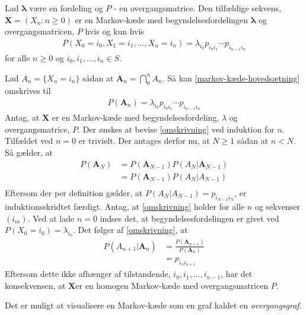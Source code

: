 \begin{minipage}\textwidth
\begin{thmx} \textbf{} %
\newline
Lad $\bm{\lambda}$ være en fordeling og $P$ - en overgangsmatrice. Den tilfældige sekvens, $\mathbf{X}=(X_n:n\geq0)$ er en Markov-kæde med begyndelsesfordelingen $\bm{\lambda}$ og overgangsmatricen, $P$ hvis og kun hvis
\begin{align}\label{markov-kæde-hovedsætning}
    P(X_0=i_0,X_1=i_1,\dots, X_n=i_n)=\lambda_{i_0}p_{i_0i_1}\cdots p_{i_{n-1}i_n}
\end{align}
for alle $n\geq0$ og $i_0,i_1,\dots,i_n\in S$.
\end{thmx}
\end{minipage}
\begin{bev} \textbf{}
\newline
Lad $A_n=\{X_n=i_n\}$ sådan at $\bm A_n=\bigcap_0^n A_n$. Så kan \eqref{markov-kæde-hovedsætning} omskrives til
\begin{align}\label{omskrivning}
    P(\bm A_n)=\lambda_{i_0}p_{i_0i_1}\cdots p_{i_{n-1}i_n}
\end{align}
Antag, at $\bm X$ er en Markov-kæde med begyndelsesfordeling, $\lambda$ og overgangsmatrice, $P$. Der ønskes at bevise \eqref{omskrivning} ved induktion for $n$. Tilfældet ved $n=0$ er trivielt. Der antages derfor nu, at $N\geq1$ sådan at $n<N$. Så gælder, at
\begin{align*}
    P(\bm A_N)&=P(\bm A_{N-1})P(A_N|\bm A_{N-1})\\
    &=P(\bm A_{N-1})P(A_N|A_{N-1})\\
\end{align*}
Eftersom der per definition gælder, at
$P(A_N|A_{N-1})=p_{i_{N-1}i_N}$, er induktionsskridtet færdigt. 
Antag, at \eqref{omskrivning} holder for alle $n$ og sekvenser $(i_m)$. Ved at lade $n=0$ indses det, at begyndelsesfordelingen er givet ved $P(X_0=i_0)=\lambda_{i_0}$. Det følger af \eqref{omskrivning}, at
\begin{align*}
    P(A_{n+1}|\bm A_n)&=\frac{P(\bm A_{n+1})}{P(\bm A_n)}\\
    &=p_{i_ni_{n+1}}
\end{align*}
Eftersom dette ikke afhænger af tilstandende, $i_0,i_1,\dots,i_{n-1}$, har det konsekvensen, at $\bm X$er en homogen Markov-kæde med overgangsmatricen $P$.

\end{bev}

Det er muligt at visualisere en Markov-kæde som en graf kaldet en \textit{overgangsgraf}. 

